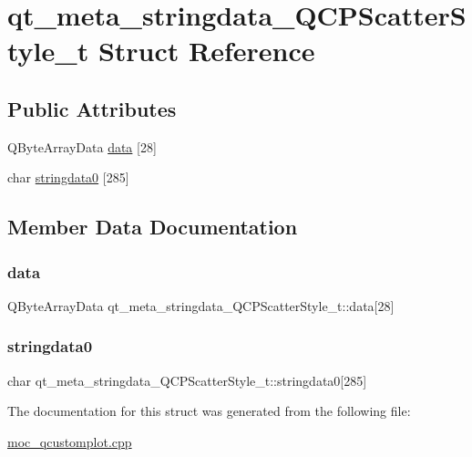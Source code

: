 \hypertarget{structqt__meta__stringdata__QCPScatterStyle__t}{}\section{qt\+\_\+meta\+\_\+stringdata\+\_\+\+Q\+C\+P\+Scatter\+Style\+\_\+t Struct Reference}
\label{structqt__meta__stringdata__QCPScatterStyle__t}
\subsection*{Public Attributes}
\begin{DoxyCompactItemize}
\item 
Q\+Byte\+Array\+Data \mbox{\hyperlink{structqt__meta__stringdata__QCPScatterStyle__t_acb6d48bc3c9529aa0eecc8d37930f3c6}{data}} \mbox{[}28\mbox{]}
\item 
char \mbox{\hyperlink{structqt__meta__stringdata__QCPScatterStyle__t_a6689ed585bd8409634a978fad9b94c3a}{stringdata0}} \mbox{[}285\mbox{]}
\end{DoxyCompactItemize}


\subsection{Member Data Documentation}
\mbox{\label{structqt__meta__stringdata__QCPScatterStyle__t_acb6d48bc3c9529aa0eecc8d37930f3c6}} 
\subsubsection{\texorpdfstring{data}{data}}
{\footnotesize\ttfamily Q\+Byte\+Array\+Data qt\+\_\+meta\+\_\+stringdata\+\_\+\+Q\+C\+P\+Scatter\+Style\+\_\+t\+::data\mbox{[}28\mbox{]}}

\mbox{\label{structqt__meta__stringdata__QCPScatterStyle__t_a6689ed585bd8409634a978fad9b94c3a}} 
\subsubsection{\texorpdfstring{stringdata0}{stringdata0}}
{\footnotesize\ttfamily char qt\+\_\+meta\+\_\+stringdata\+\_\+\+Q\+C\+P\+Scatter\+Style\+\_\+t\+::stringdata0\mbox{[}285\mbox{]}}



The documentation for this struct was generated from the following file\+:\begin{DoxyCompactItemize}
\item 
\mbox{\hyperlink{moc__qcustomplot_8cpp}{moc\+\_\+qcustomplot.\+cpp}}\end{DoxyCompactItemize}
